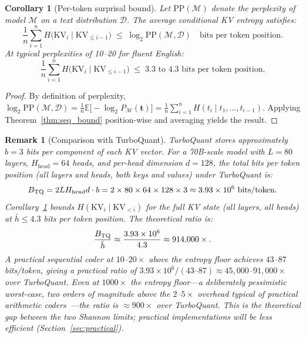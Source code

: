 \documentclass[11pt]{article}
\newtheorem{corollary}{Corollary}
\newtheorem{remark}{Remark}
\begin{document}
\begin{corollary}[Per-token surprisal bound]
\label{cor:surprisal}
Let $\mathrm{PP}(\mathcal{M})$ denote the perplexity of model $\mathcal{M}$ on a
text distribution $\mathcal{D}$.  The average conditional KV entropy satisfies:
\[
  \frac{1}{n}\sum_{i=1}^n H\bigl(\mathrm{KV}_i \mid \mathrm{KV}_{\leq i-1}\bigr)
  \;\leq\;
  \log_2 \mathrm{PP}(\mathcal{M}, \mathcal{D}) \quad \text{bits per token position.}
\]
At typical perplexities of 10--20 for fluent English:
\[
  \frac{1}{n}\sum_{i=1}^n H\bigl(\mathrm{KV}_i \mid \mathrm{KV}_{\leq i-1}\bigr)
  \;\leq\; 3.3 \text{ to } 4.3 \text{ bits per token position.}
\]
\end{corollary}

\begin{proof}
By definition of perplexity, $\log_2 \mathrm{PP}(\mathcal{M}, \mathcal{D}) =
\frac{1}{n} \mathbb{E}\bigl[-\log_2 P_{\mathcal{M}}(\mathbf{t})\bigr] =
\frac{1}{n} \sum_{i=1}^n H(t_i \mid t_1,\ldots,t_{i-1})$.
Applying Theorem~\ref{thm:seq_bound} position-wise and averaging yields the result.
\end{proof}

\begin{remark}[Comparison with TurboQuant]
\label{rem:comparison}
TurboQuant stores approximately $b = 3$ bits \emph{per component} of each KV
vector.  For a 70B-scale model with $L=80$ layers, $H_{\mathrm{head}}=64$ heads, and per-head
dimension $d=128$, the \emph{total} bits per token position (all layers and
heads, both keys and values) under TurboQuant is:
\[
  B_{\rm TQ} = 2LH_{\mathrm{head}}d \cdot b = 2 \times 80 \times 64 \times 128 \times 3
  \approx 3.93 \times 10^6 \text{ bits/token.}
\]
Corollary~\ref{cor:surprisal} bounds $H(\mathrm{KV}_i \mid \mathrm{KV}_{<i})$
for the \emph{full} KV state (all layers, all heads) at $\bar{h} \leq 4.3$ bits
per token position.  The theoretical ratio is:
\[
  \frac{B_{\rm TQ}}{\bar{h}}
  \approx \frac{3.93 \times 10^6}{4.3} \approx 914{,}000\times.
\]
A practical sequential coder at $10\text{--}20\times$ above the entropy floor
achieves $43$--$87$ bits/token, giving a practical ratio of
$3.93\times10^6 / (43\text{--}87) \approx 45{,}000$--$91{,}000\times$ over
TurboQuant.  Even at $1000\times$ the entropy floor---a deliberately pessimistic
worst-case, two orders of magnitude above the $2$--$5\times$ overhead typical
of practical arithmetic coders~\cite{witten1987,cover2006}---the ratio is
$\approx 900\times$ over TurboQuant.
This is the theoretical gap between the two Shannon limits; practical
implementations will be less efficient (Section~\ref{sec:practical}).
\end{remark}
\end{document}
